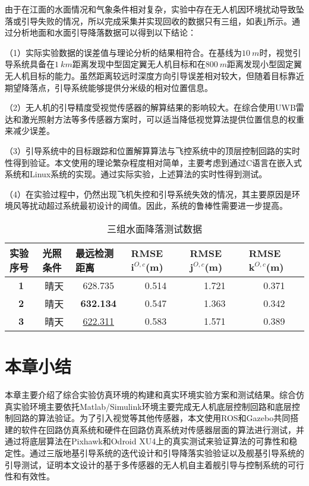 由于在江面的水面情况和气象条件相对复杂，实验中存在无人机因环境扰动导致坠落或引导失败的情况，所以完成采集并实现回收的数据只有三组，如表\ref{lab:three_ship_landing}所示。通过分析地面和水面引导降落数据可以得到以下结论：

（1）实际实验数据的误差值与理论分析的结果相符合。在基线为$10\ m$时，视觉引导系统具备在$1\ km$距离发现中型固定翼无人机目标和在$800\ m$距离发现小型固定翼无人机目标的能力。虽然距离较远时深度方向引导误差相对较大，但随着目标靠近期望降落点，引导系统能够提供分米级的相对位置信息。

（2）无人机的引导精度受视觉传感器的解算结果的影响较大。在综合使用UWB雷达和激光照射方法等多传感器方案时，可以适当降低视觉算法提供位置信息的权重来减少误差。

（3）引导系统中的目标跟踪和位置解算算法与飞控系统中的顶层控制回路的实时性得到验证。本文使用的理论繁杂程度相对简单，主要考虑到通过C语言在嵌入式系统和Linux系统的实现。通过实际实验，上述算法的实时性得到测试。

（4）在实验过程中，仍然出现飞机失控和引导系统失效的情况，其主要原因是环境风等扰动超过系统最初设计的阈值。因此，系统的鲁棒性需要进一步提高。

\begin{table}[!th]
	\centering
	\caption{三组水面降落测试数据}
	\label{lab:three_ship_landing}
	\begin{tabular}{cccccc}
		\hline
		\multicolumn{1}{l}{\textbf{实验序号}} & \multicolumn{1}{l}{\textbf{光照条件}} & \multicolumn{1}{l}{\textbf{最远检测距离}} & \multicolumn{1}{l}{\textbf{RMSE $\mathbf{i}^{O,c}$(m)}} & \multicolumn{1}{l}{\textbf{RMSE $\mathbf{j}^{O,c}$(m)}} & \multicolumn{1}{l}{\textbf{RMSE $\mathbf{k}^{O,c}$(m)}} \\ \hline
		\textbf{1} & 晴天 & 628.735 & 0.514 & 1.721 & 0.371 \\
		\textbf{2} & 晴天 & \textbf{632.134} & 0.547 & 1.363 & 0.342 \\
		\textbf{3} & 晴天 & \underline{622.311} & 0.583 & 1.571 & 0.389 \\ \hline
	\end{tabular}
\end{table}


\section{本章小结}
本章主要介绍了综合实验仿真环境的构建和真实环境实验方案和测试结果。综合仿真实验环境主要依托Matlab/Simulink环境主要完成无人机底层控制回路和底层控制回路的算法验证。为了引入视觉等其他传感器，本文使用ROS和Gazebo共同搭建的软件在回路仿真系统和硬件在回路仿真系统对传感器层面的算法进行测试，并通过将底层算法在Pixhawk和Odroid XU4上的真实测试来验证算法的可靠性和稳定性。通过三版地基引导系统的迭代设计和引导降落实验验证以及舰基引导系统的引导测试，证明本文设计的基于多传感器的无人机自主着舰引导与控制系统的可行性和有效性。